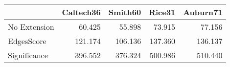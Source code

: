 \begin{tabular}{lrrrr}
\toprule
{} & Caltech36 & Smith60 &  Rice31 & Auburn71 \\
\midrule
No Extension &    60.425 &  55.898 &  73.915 &   77.156 \\
EdgesScore   &   121.174 & 106.136 & 137.360 &  136.137 \\
Significance &   396.552 & 376.324 & 500.986 &  510.440 \\
\bottomrule
\end{tabular}
